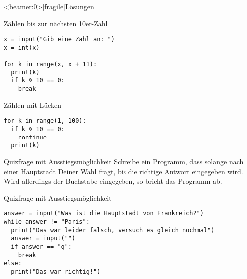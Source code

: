 \begin{frame}<beamer:0>[fragile]{Lösungen}

\begin{solutionblock}{Zählen bis zur nächsten 10er-Zahl}
\begin{verbatim}
x = input("Gib eine Zahl an: ")
x = int(x)

for k in range(x, x + 11):
  print(k)
  if k % 10 == 0:
    break
\end{verbatim}
\end{solutionblock}

\vspace{12pt}

\begin{solutionblock}{Zählen mit Lücken}
\begin{verbatim}
for k in range(1, 100):
  if k % 10 == 0:
    continue
  print(k)
\end{verbatim}
\end{solutionblock}

\end{frame}

\begin{fragile}[Übung]
\begin{block}{Quizfrage mit Ausstiegsmöglichkeit}
\vspace{2pt}
Schreibe ein Programm, dass solange nach einer Hauptstadt Deiner Wahl fragt, bis die richtige Antwort eingegeben wird. Wird allerdings der Buchstabe  eingegeben, so bricht das Programm ab. 

\vspace{12pt}

\begin{solutionblock}{Quizfrage mit Ausstiegsmöglichkeit}
\begin{verbatim}
answer = input("Was ist die Hauptstadt von Frankreich?")
while answer != "Paris": 
  print("Das war leider falsch, versuch es gleich nochmal")
  answer = input("")
  if answer == "q": 
    break
else: 
  print("Das war richtig!")
\end{verbatim}
\end{solutionblock}
\end{block}
\end{fragile}




